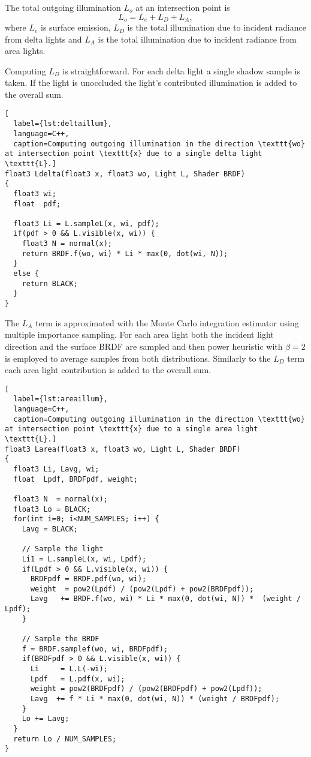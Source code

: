 The total outgoing illumination $L_{o}$ at an intersection point is
\begin{equation}
  L_{o} = L_{e} + L_{D} + L_{A},
\end{equation}
where $L_{e}$ is surface emission, $L_{D}$ is the total illumination due to incident radiance from delta lights and $L_{A}$ is the total illumination due to incident radiance from area lights.

Computing $L_{D}$ is straightforward. For each delta light a single shadow sample is taken. If the light is unoccluded the light's contributed illumination is added to the overall sum.

\begin{lstlisting}[
  label={lst:deltaillum},
  language=C++,
  caption=Computing outgoing illumination in the direction \texttt{wo} at intersection point \texttt{x} due to a single delta light \texttt{L}.]
float3 Ldelta(float3 x, float3 wo, Light L, Shader BRDF)
{
  float3 wi;
  float  pdf;

  float3 Li = L.sampleL(x, wi, pdf);
  if(pdf > 0 && L.visible(x, wi)) {
    float3 N = normal(x);
    return BRDF.f(wo, wi) * Li * max(0, dot(wi, N));
  }
  else {
    return BLACK;
  }
}
\end{lstlisting}

The $L_{A}$ term is approximated with the Monte Carlo integration estimator using multiple importance sampling. For each area light both the incident light direction and the surface BRDF are sampled and then power heuristic with $\beta=2$ is employed to average samples from both distributions. Similarly to the $L_{D}$ term each area light contribution is added to the overall sum.

\begin{lstlisting}[
  label={lst:areaillum},
  language=C++,
  caption=Computing outgoing illumination in the direction \texttt{wo} at intersection point \texttt{x} due to a single area light \texttt{L}.]
float3 Larea(float3 x, float3 wo, Light L, Shader BRDF)
{
  float3 Li, Lavg, wi;
  float  Lpdf, BRDFpdf, weight;

  float3 N  = normal(x);
  float3 Lo = BLACK;
  for(int i=0; i<NUM_SAMPLES; i++) {
    Lavg = BLACK;

    // Sample the light
    Li1 = L.sampleL(x, wi, Lpdf);
    if(Lpdf > 0 && L.visible(x, wi)) {
      BRDFpdf = BRDF.pdf(wo, wi);
      weight  = pow2(Lpdf) / (pow2(Lpdf) + pow2(BRDFpdf));
      Lavg   += BRDF.f(wo, wi) * Li * max(0, dot(wi, N)) *  (weight / Lpdf);
    }

    // Sample the BRDF
    f = BRDF.samplef(wo, wi, BRDFpdf);
    if(BRDFpdf > 0 && L.visible(x, wi)) {
      Li     = L.L(-wi);
      Lpdf   = L.pdf(x, wi);
      weight = pow2(BRDFpdf) / (pow2(BRDFpdf) + pow2(Lpdf));
      Lavg  += f * Li * max(0, dot(wi, N)) * (weight / BRDFpdf);
    }
    Lo += Lavg;
  }
  return Lo / NUM_SAMPLES;
}
\end{lstlisting}
\vfill

